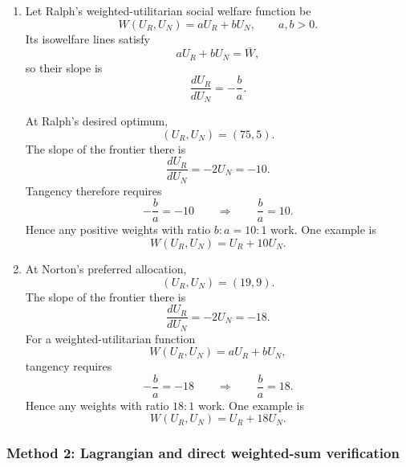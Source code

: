 \documentclass[12pt]{article}
\begin{document}
\begin{enumerate}[label=(\alph*)]
    \item
    Let Ralph's weighted-utilitarian social welfare function be
    \[
    W(U_R,U_N)=aU_R+bU_N,
    \qquad a,b>0.
    \]
    Its isowelfare lines satisfy
    \[
    aU_R+bU_N=\bar W,
    \]
    so their slope is
    \[
    \frac{dU_R}{dU_N}=-\frac{b}{a}.
    \]

    At Ralph's desired optimum,
    \[
    (U_R,U_N)=(75,5).
    \]
    The slope of the frontier there is
    \[
    \frac{dU_R}{dU_N}=-2U_N=-10.
    \]
    Tangency therefore requires
    \[
    -\frac{b}{a}=-10
    \qquad\Longrightarrow\qquad
    \frac{b}{a}=10.
    \]
    Hence any positive weights with ratio $b:a=10:1$ work. One example is
    \[
    \boxed{W(U_R,U_N)=U_R+10U_N.}
    \]

    \item
    At Norton's preferred allocation,
    \[
    (U_R,U_N)=(19,9).
    \]
    The slope of the frontier there is
    \[
    \frac{dU_R}{dU_N}=-2U_N=-18.
    \]
    For a weighted-utilitarian function
    \[
    W(U_R,U_N)=aU_R+bU_N,
    \]
    tangency requires
    \[
    -\frac{b}{a}=-18
    \qquad\Longrightarrow\qquad
    \frac{b}{a}=18.
    \]
    Hence any weights with ratio $18:1$ work. One example is
    \[
    \boxed{W(U_R,U_N)=U_R+18U_N.}
    \]
\end{enumerate}

\newpage
\subsubsection{Method 2: Lagrangian and direct weighted-sum verification}
\end{document}
